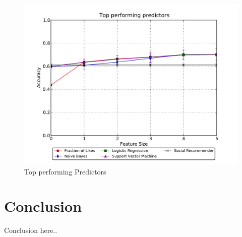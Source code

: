 \begin{figure}[h]
	\begin{center}
		\includegraphics[scale=0.85]{imgs/TopPerforming.pdf}
		\caption{Top performing Predictors}
	\end{center}
\end{figure}


\clearpage
\section{Conclusion}
\label{sec:ITconclusion}

Conclusion here..

